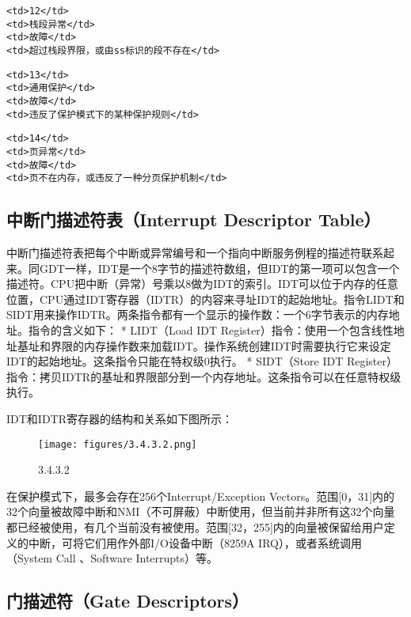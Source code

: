 \begin{lstlisting}
<td>12</td>
<td>栈段异常</td>
<td>故障</td>
<td>超过栈段界限，或由ss标识的段不存在</td>
\end{lstlisting}

\begin{lstlisting}
<td>13</td>
<td>通用保护</td>
<td>故障</td>
<td>违反了保护模式下的某种保护规则</td>
\end{lstlisting}

\begin{lstlisting}
<td>14</td>
<td>页异常</td>
<td>故障</td>
<td>页不在内存，或违反了一种分页保护机制</td>
\end{lstlisting}

\subsection{中断门描述符表（Interrupt Descriptor
Table）}\label{ux4e2dux65adux95e8ux63cfux8ff0ux7b26ux8868interrupt-descriptor-table}

中断门描述符表把每个中断或异常编号和一个指向中断服务例程的描述符联系起来。同GDT一样，IDT是一个8字节的描述符数组，但IDT的第一项可以包含一个描述符。CPU把中断（异常）号乘以8做为IDT的索引。IDT可以位于内存的任意位置，CPU通过IDT寄存器（IDTR）的内容来寻址IDT的起始地址。指令LIDT和SIDT用来操作IDTR。两条指令都有一个显示的操作数：一个6字节表示的内存地址。指令的含义如下：
* LIDT（Load IDT
Register）指令：使用一个包含线性地址基址和界限的内存操作数来加载IDT。操作系统创建IDT时需要执行它来设定IDT的起始地址。这条指令只能在特权级0执行。
* SIDT（Store IDT
Register）指令：拷贝IDTR的基址和界限部分到一个内存地址。这条指令可以在任意特权级执行。

IDT和IDTR寄存器的结构和关系如下图所示：

\begin{figure}[htbp]
\centering
\texttt{[image: figures/3.4.3.2.png]}
\caption{3.4.3.2}
\end{figure}

在保护模式下，最多会存在256个Interrupt/Exception
Vectors。范围{[}0，31{]}内的32个向量被故障中断和NMI（不可屏蔽）中断使用，但当前并非所有这32个向量都已经被使用，有几个当前没有被使用。范围{[}32，255{]}内的向量被保留给用户定义的中断，可将它们用作外部I/O设备中断（8259A
IRQ），或者系统调用（System Call 、Software Interrupts）等。~

\subsection{门描述符（Gate
Descriptors）}\label{ux95e8ux63cfux8ff0ux7b26gate-descriptors}

